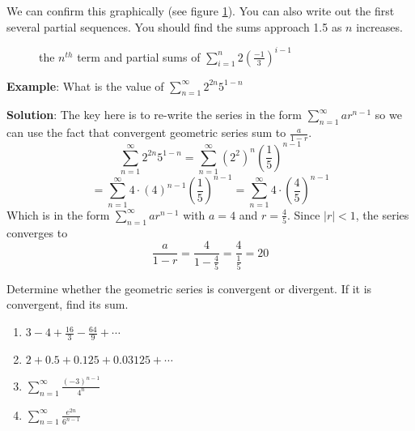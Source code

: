 We can confirm this graphically (see figure \ref{fig:geometric}). You 
can also write out the first several partial sequences. You should 
find the sums approach 1.5 as $n$ increases.

\begin{figure}[htbp]
\centering
    \caption{the $n^{th}$ term and partial sums of $\sum_{i=1}^n 
    2(\frac{-1}{3})^{i-1}$}
    \label{fig:geometric}
\end{figure}

\textbf{Example}: What is the value of $\sum_{n=1}^\infty 2^{2n}5^{1-n}$

\textbf{Solution}: The key here is to re-write the series in the form $\sum_
{n=1}^\infty ar^{n -1}$ so we can use the fact that convergent geometric 
series sum to $\frac{a}{1-r}$. 
$$\sum_{n=1}^\infty 2^{2n}5^{1-n} = \sum_{n=1}^\infty \left( 2^2 \right)^n 
\left( \frac{1}{5} \right)^{n-1}$$
$$= \sum_{n=1}^\infty 4 \cdot \left( 4 \right)^{n-1} \left( \frac{1}{5} 
\right)^{n-1} = \sum_{n=1}^\infty 4 \cdot \left( \frac{4}{5} \right)^{n-1}$$
Which is in the form $\sum_{n=1}^\infty ar^{n -1}$ with $a=4$ and $r=
\frac{4}{5}$. Since $|r| < 1$, the series converges to 
$$\frac{a}{1-r} = \frac{4}{1-\frac{4}{5}} = \frac{4}{\frac{1}{5}} = 20$$

\begin{Exercise}[label=geo1]
Determine whether the geometric series is convergent or divergent. If it is 
convergent, find its sum.
\begin{enumerate}
\item $3 - 4 + \frac{16}{3} - \frac{64}{9} + \cdots$
\item $2 + 0.5 + 0.125 + 0.03125 + \cdots$
\item $\sum_{n=1}^\infty \frac{(-3)^{n-1}}{4^n}$
\item $\sum_{n=1}^\infty \frac{e^{2n}}{6^{n-1}}$
\end{enumerate}
\end{Exercise}

